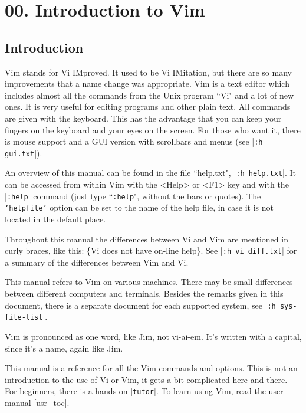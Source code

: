 \section{00. Introduction to Vim}
\label{ref}
\label{reference}
\localtableofcontents
\subsection{Introduction}
\label{intro}
Vim stands for Vi IMproved.
It used to be Vi IMitation, but there are so many improvements that a name change was appropriate.
Vim is a text editor which includes almost all the commands from the Unix program ``Vi" and a lot of new ones.
It is very useful for editing programs and other plain text.
All commands are given with the keyboard.
This has the advantage that you can keep your fingers on the keyboard and your eyes on the screen.
For those who want it, there is mouse support and a GUI version with scrollbars and menus (see |\texttt{:h gui.txt}|).

An overview of this manual can be found in the file ``help.txt", |\texttt{:h help.txt}|.
It can be accessed from within Vim with the <Help> or <F1> key and with the |\texttt{:help}| command (just type ``\texttt{:help}", without the bars or quotes).
The \texttt{'helpfile'} option can be set to the name of the help file, in case it is not located in the default place.

Throughout this manual the differences between Vi and Vim are mentioned in curly braces, like this: \{Vi does not have on-line help\}.
See |\texttt{:h vi\_diff.txt}| for a summary of the differences between Vim and Vi.

This manual refers to Vim on various machines.
There may be small differences between different computers and terminals.
Besides the remarks given in this document, there is a separate document for each supported system, see |\texttt{:h sys-file-list}|.

\label{pronounce}
Vim is pronounced as one word, like Jim, not vi-ai-em.
It's written with a capital, since it's a name, again like Jim.

This manual is a reference for all the Vim commands and options.
This is not an introduction to the use of Vi or Vim, it gets a bit complicated here and there.
For beginners, there is a hands-on \hyperref[tutor]{|\texttt{tutor}|}.
To learn using Vim, read the user manual \ref{usr_toc}.

